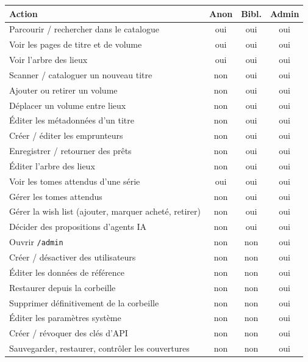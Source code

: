 \begin{longtable}{@{} l c c c @{}}
\toprule
\textbf{Action} & \textbf{Anon} & \textbf{Bibl.} & \textbf{Admin} \\
\midrule
\endhead
Parcourir / rechercher dans le catalogue & oui & oui & oui \\
Voir les pages de titre et de volume     & oui & oui & oui \\
Voir l'arbre des lieux                   & oui & oui & oui \\
\midrule
Scanner / cataloguer un nouveau titre    & non & oui & oui \\
Ajouter ou retirer un volume             & non & oui & oui \\
Déplacer un volume entre lieux           & non & oui & oui \\
Éditer les métadonnées d'un titre        & non & oui & oui \\
Créer / éditer les emprunteurs           & non & oui & oui \\
Enregistrer / retourner des prêts        & non & oui & oui \\
Éditer l'arbre des lieux                 & non & oui & oui \\
Voir les tomes attendus d'une série      & oui & oui & oui \\
Gérer les tomes attendus                 & non & oui & oui \\
Gérer la wish list (ajouter, marquer acheté, retirer) & non & oui & oui \\
Décider des propositions d'agents IA     & non & oui & oui \\
\midrule
Ouvrir \texttt{/admin}                   & non & non & oui \\
Créer / désactiver des utilisateurs      & non & non & oui \\
Éditer les données de référence          & non & non & oui \\
Restaurer depuis la corbeille            & non & non & oui \\
Supprimer définitivement de la corbeille & non & non & oui \\
Éditer les paramètres système            & non & non & oui \\
Créer / révoquer des clés d'API          & non & non & oui \\
Sauvegarder, restaurer, contrôler les couvertures & non & non & oui \\
\bottomrule
\end{longtable}

